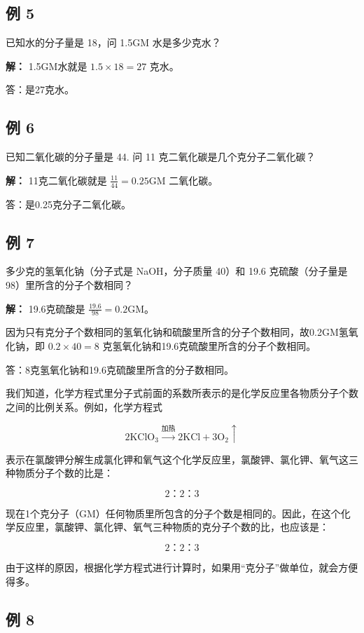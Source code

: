 \subsection{例 5}

已知水的分子量是 18，问 1.5GM 水是多少克水？

\textbf{解：} 1.5GM水就是 \(1.5\times18=27\) 克水。

答：是27克水。

\subsection{例 6}

已知二氧化碳的分子量是 44. 问 11 克二氧化碳是几个克分子二氧化碳？

\textbf{解：} 11克二氧化碳就是 \(\frac{11}{44} = 0.25\mathrm{GM}\)
二氧化碳。

答：是0.25克分子二氧化碳。

\subsection{例 7}

多少克的氢氧化钠（分子式是 NaOH，分子质量 40）和 19.6 克硫酸（分子量是
98）里所含的分子个数相同？

\textbf{解：} 19.6克硫酸是 \(\frac{19.6}{98} = 0.2\mathrm{GM}\)。

因为只有克分子个数相同的氢氧化钠和硫酸里所含的分子个数相同，故0.2GM氢氧化钠，即
\(0.2 \times 40 = 8\) 克氢氧化钠和19.6克硫酸里所含的分子个数相同。

答：8克氢氧化钠和19.6克硫酸里所含的分子数相同。

我们知道，化学方程式里分子式前面的系数所表示的是化学反应里各物质分子个数之间的比例关系。例如，化学方程式

\[
2 \mathrm{KClO}_{3} \xrightarrow {\text{加热}} 2 \mathrm{KCl} + 3 \mathrm{O}_{2} \uparrow
\]

表示在氯酸钾分解生成氯化钾和氧气这个化学反应里，氯酸钾、氯化钾、氧气这三种物质分子个数的比是：

\[
2\text{：} 2\text{：} 3
\]

现在1个克分子（GM）任何物质里所包含的分子个数是相同的。因此，在这个化学反应里，氯酸钾、氯化钾、氧气三种物质的克分子个数的比，也应该是：

\[
2\text{：} 2\text{：} 3
\]

由于这样的原因，根据化学方程式进行计算时，如果用``克分子''做单位，就会方便得多。

\subsection{例 8}

